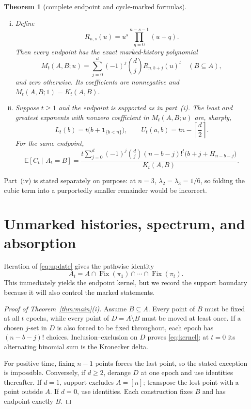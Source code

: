 \documentclass[a4paper,10pt]{amsart}
\newtheorem{theorem}{Theorem}
\theoremstyle{remark}
\newcommand{\Fix}{\operatorname{Fix}}
\newcommand{\E}{\mathbb E}
\newcommand{\ind}{\mathbf 1}
\begin{document}
\begin{theorem}[complete endpoint and cycle-marked formulas]
\begin{enumerate}[(i)]
\item Define
\begin{equation}\label{eq:Rns}
 R_{n,s}(u)=u^s\prod_{q=0}^{n-s-1}(u+q).
\end{equation}
Then every endpoint has the exact marked-history polynomial
\begin{equation}\label{eq:marked}
 M_t(A,B;u)=\sum_{j=0}^{d}(-1)^j\binom dj
              R_{n,b+j}(u)^t
 \quad(B\subseteq A),
\end{equation}
and zero otherwise.  Its coefficients are nonnegative and
$M_t(A,B;1)=K_t(A,B)$.

\item Suppose $t\ge1$ and the endpoint is supported as in part~(i).  The
least and greatest exponents with nonzero coefficient in
$M_t(A,B;u)$ are, sharply,
\begin{equation}\label{eq:extrema}
 L_t(b)=t\bigl(b+\ind_{\{b<n\}}\bigr),
 \qquad U_t(a,b)=tn-\left\lceil\frac d2\right\rceil.
\end{equation}
For the same endpoint,
\begin{equation}\label{eq:conditional}
 \E[C_t\mid A_t=B]
 =\frac{t\displaystyle\sum_{j=0}^{d}(-1)^j\binom dj
       (n-b-j)!^t\bigl(b+j+H_{n-b-j}\bigr)}
 {K_t(A,B)}.
\end{equation}
\end{enumerate}
\end{theorem}

Part~(iv) is stated separately on purpose: at $n=3$,
$\lambda_2=\lambda_3=1/6$, so folding the cubic term into a purportedly
smaller remainder would be incorrect.

\section{Unmarked histories, spectrum, and absorption}

Iteration of \eqref{eq:update} gives the pathwise identity
\begin{equation}\label{eq:pathwise}
 A_t=A\cap\Fix(\pi_1)\cap\cdots\cap\Fix(\pi_t).
\end{equation}
This immediately yields the endpoint kernel, but we record the support
boundary because it will also control the marked statements.

\begin{proof}[Proof of Theorem~\ref{thm:main}(i)]
Assume $B\subseteq A$.  Every point of $B$ must be fixed at all $t$ epochs,
while every point of $D=A\setminus B$ must be moved at least once.  If a
chosen $j$-set in $D$ is also forced to be fixed throughout, each epoch has
$(n-b-j)!$ choices.  Inclusion--exclusion on $D$ proves
\eqref{eq:kernel}; at $t=0$ its alternating binomial sum is the Kronecker
delta.

For positive time, fixing $n-1$ points forces the last point, so the stated
exception is impossible.  Conversely, if $d\ge2$, derange $D$ at one epoch
and use identities thereafter.  If $d=1$, support excludes $A=[n]$; transpose
the lost point with a point outside $A$.  If $d=0$, use identities.  Each
construction fixes $B$ and has endpoint exactly $B$.
\end{proof}
\end{document}
